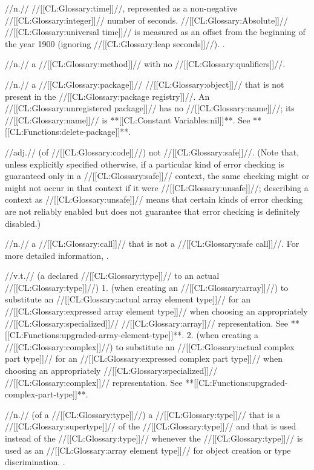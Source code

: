  //n.// //[[CL:Glossary:time]]//, represented as a non-negative //[[CL:Glossary:integer]]// number of seconds. //[[CL:Glossary:Absolute]]// //[[CL:Glossary:universal time]]// is measured as an offset from the beginning of the year 1900 (ignoring //[[CL:Glossary:leap seconds]]//). \Seesection\UniversalTime.

 //n.// a //[[CL:Glossary:method]]// with no //[[CL:Glossary:qualifiers]]//.

 //n.// a //[[CL:Glossary:package]]// //[[CL:Glossary:object]]// that is not present in the //[[CL:Glossary:package registry]]//. An //[[CL:Glossary:unregistered package]]// has no //[[CL:Glossary:name]]//; \ie its //[[CL:Glossary:name]]// is **[[CL:Constant Variables:nil]]**. See **[[CL:Functions:delete-package]]**.

 //adj.// (of //[[CL:Glossary:code]]//) not //[[CL:Glossary:safe]]//. (Note that, unless explicitly specified otherwise, if a particular kind of error checking is guaranteed only in a //[[CL:Glossary:safe]]// context, the same checking might or might not occur in that context if it were //[[CL:Glossary:unsafe]]//; describing a context as //[[CL:Glossary:unsafe]]// means that certain kinds of error checking are not reliably enabled but does not guarantee that error checking is definitely disabled.)

 //n.// a //[[CL:Glossary:call]]// that is not a //[[CL:Glossary:safe call]]//. For more detailed information, \seesection\SafeAndUnsafeCalls.

 //v.t.// (a declared //[[CL:Glossary:type]]// to an actual //[[CL:Glossary:type]]//) 1. (when creating an //[[CL:Glossary:array]]//) to substitute an //[[CL:Glossary:actual array element type]]// for an //[[CL:Glossary:expressed array element type]]// when choosing an appropriately //[[CL:Glossary:specialized]]// //[[CL:Glossary:array]]// representation. See **[[CL:Functions:upgraded-array-element-type]]**. 2. (when creating a //[[CL:Glossary:complex]]//) to substitute an //[[CL:Glossary:actual complex part type]]// for an //[[CL:Glossary:expressed complex part type]]// when choosing an appropriately //[[CL:Glossary:specialized]]// //[[CL:Glossary:complex]]// representation. See **[[CL:Functions:upgraded-complex-part-type]]**.

 //n.// (of a //[[CL:Glossary:type]]//) a //[[CL:Glossary:type]]// that is a //[[CL:Glossary:supertype]]// of the //[[CL:Glossary:type]]// and that is used instead of the //[[CL:Glossary:type]]// whenever the //[[CL:Glossary:type]]// is used as an //[[CL:Glossary:array element type]]// for object creation or type discrimination. \Seesection\ArrayUpgrading.

